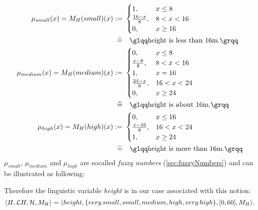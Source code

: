 \begin{align*}
\mu_{small}(x) = M_H(small)(x) :=& \ \begin{cases}
		1, &x \leq 8 \\
		\frac{16-x}{8}, &8 < x < 16 \\
		0, &x \geq 16
	\end{cases} \\
	 \widehat{=}& \quad \qq{\text{height is less than $16$m.}} \\
\mu_{medium}(x) = M_H(medium)(x) :=& \ \begin{cases}
		0, &x \leq 8 \\
		\frac{x-8}{8}, & 8 < x < 16 \\
		1, &x = 16 \\
		\frac{24-x}{8}, &16 < x < 24 \\
		0, &x \geq 24
	\end{cases} \\
	\widehat{=}& \quad \qq{\text{height is about $16$m.}} \\
\mu_{high}(x) = M_H(high)(x) :=& \ \begin{cases}
		0, &x \leq 16 \\
		\frac{x-16}{8}, &16 < x < 24 \\
		1, &x \geq 24
	\end{cases} \\
	\widehat{=}& \quad \qq{\text{height is more than $16$m.}}
\end{align*}
$\mu_{small},\, \mu_{medium}$ and $\mu_{high}$ are socalled \emph{fuzzy numbers} (\ref{sec:fuzzyNumbers})  and can be illustrated as following:
\begin{figure}[H]
\centering
{}
\end{figure} \FigureHSpace
Therefore the linguistic variable \textit{height} is in our case associated with this notion:
\[ \langle H, \mathcal{L}H, \mathcal{H}, M_H \rangle = \langle height, \{ very\, small, small, medium, high, very\, high \}, [0,60], M_H \rangle.\]

